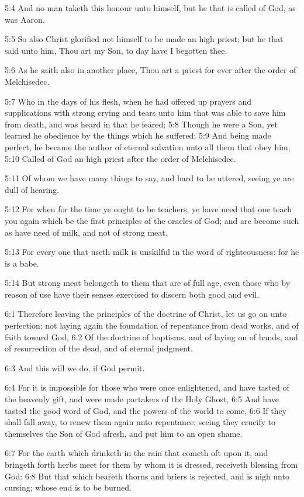 5:4 And no man taketh this honour unto himself, but he that is called of God, as was Aaron.

5:5 So also Christ glorified not himself to be made an high priest; but he that said unto him, Thou art my Son, to day have I begotten thee.

5:6 As he saith also in another place, Thou art a priest for ever after the order of Melchisedec.

5:7 Who in the days of his flesh, when he had offered up prayers and supplications with strong crying and tears unto him that was able to save him from death, and was heard in that he feared; 5:8 Though he were a Son, yet learned he obedience by the things which he suffered; 5:9 And being made perfect, he became the author of eternal salvation unto all them that obey him; 5:10 Called of God an high priest after the order of Melchisedec.

5:11 Of whom we have many things to say, and hard to be uttered, seeing ye are dull of hearing.

5:12 For when for the time ye ought to be teachers, ye have need that one teach you again which be the first principles of the oracles of God; and are become such as have need of milk, and not of strong meat.

5:13 For every one that useth milk is unskilful in the word of righteousness: for he is a babe.

5:14 But strong meat belongeth to them that are of full age, even those who by reason of use have their senses exercised to discern both good and evil.

6:1 Therefore leaving the principles of the doctrine of Christ, let us go on unto perfection; not laying again the foundation of repentance from dead works, and of faith toward God, 6:2 Of the doctrine of baptisms, and of laying on of hands, and of resurrection of the dead, and of eternal judgment.

6:3 And this will we do, if God permit.

6:4 For it is impossible for those who were once enlightened, and have tasted of the heavenly gift, and were made partakers of the Holy Ghost, 6:5 And have tasted the good word of God, and the powers of the world to come, 6:6 If they shall fall away, to renew them again unto repentance; seeing they crucify to themselves the Son of God afresh, and put him to an open shame.

6:7 For the earth which drinketh in the rain that cometh oft upon it, and bringeth forth herbs meet for them by whom it is dressed, receiveth blessing from God: 6:8 But that which beareth thorns and briers is rejected, and is nigh unto cursing; whose end is to be burned.

